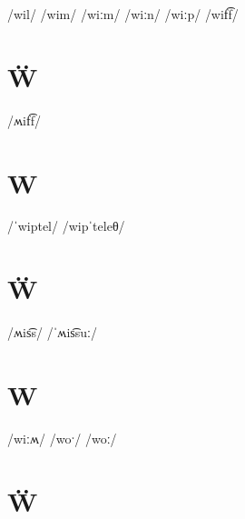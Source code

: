 \documentclass[10pt,a4paper,twoside]{book}
\begin{document}
\begin{multicols}{3}
 {/wil/} {}
 {/wim/} {}
 {/wiːm/} {}
 {/wiːn/} {}
 {/wiːp/} {}
 {/wif͡f/} {}
\end{multicols}

\section*{Ẅ}

\begin{multicols}{3}
 {/ʍif͡f/} {}
\end{multicols}

\section*{W}

\begin{multicols}{3}
 {/ˈwiptel/} {}
 {/wipˈteleθ/} {}
\end{multicols}

\section*{Ẅ}

\begin{multicols}{3}
 {/ʍis͡s/} {}
 {/ˈʍis͡suː/} {}
\end{multicols}

\section*{W}

\begin{multicols}{3}
 {/wiːʍ/} {}
 {/woˑ/} {}
 {/woː/} {}
\end{multicols}

\section*{Ẅ}
\end{document}
